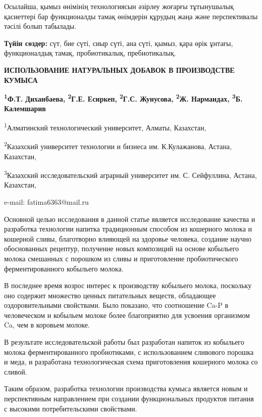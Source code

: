 Осылайша, қымыз өнімінің технологиясын әзірлеу жоғарғы тұтынушылық
қасиеттері бар функционалды тамақ өнімдерін құрудың жаңа және
перспективалы тәсілі болып табылады.

{\bfseries Түйін сөздер:} сүт, бие сүті, сиыр сүті, ана сүті, қымыз, қара
өрік ұнтағы, функционалдық тамақ, пробиотикалық, пребиотикалық.

\begin{center}
{\large\bfseries ИСПОЛЬЗОВАНИЕ НАТУРАЛЬНЫХ ДОБАВОК В ПРОИЗВОДСТВЕ КУМЫСА}

{\bfseries \textsuperscript{1}Ф.Т. Диханбаева\envelope, \textsuperscript{2}Г.Е. Есиркеп, \textsuperscript{2}Г.С. Жунусова, \textsuperscript{2}Ж. Нармандах, \textsuperscript{3}Б. Калемшарив}

\textsuperscript{1}Алматинский технологический университет, Алматы,
Казахстан,

\textsuperscript{2}Казахский университет технологии и бизнеса им.
К.Кулажанова, Астана, Казахстан,

\textsuperscript{3}Казахский исследовательский аграрный университет им.
С. Сейфуллина, Астана, Казахстан,

e-mail: fatima6363@mail.ru
\end{center}

Основной целью исследования в данной статье является исследование
качества и разработка технологии напитка традиционным способом из
кошерного молока и кошерной сливы, благотворно влияющей на здоровье
человека, создание научно обоснованных рецептур, получение новых
композиций на основе кобыльего молока смешанных с порошком из сливы и
приготовление пробиотического ферментированного кобыльего молока.

В последнее время возрос интерес к производству кобыльего молока,
поскольку оно содержит множество ценных питательных веществ, обладающее
оздоровительными свойствами. Было показано, что соотношение Ca-P в
человеческом и кобыльем молоке более благоприятно для усвоения
организмом Ca, чем в коровьем молоке.

В результате исследовательской работы был разработан напиток из
кобыльего молока ферментированного пробиотиками, с использованием
сливового порошка и меда, и разработана технологическая схема
приготовления кошерного молока со сливой.

Таким образом, разработка технологии производства кумыса является новым
и перспективным направлением при создании функциональных продуктов
питания с высокими потребительскими свойствами.


